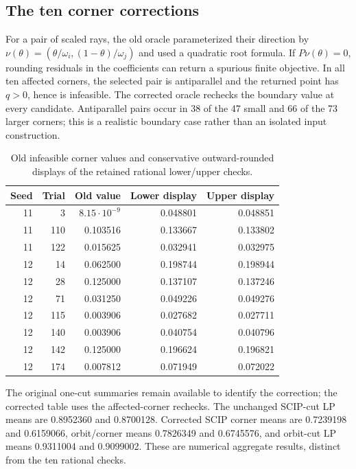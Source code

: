 \subsection{The ten corner corrections}
\label{exp:ten-corrections}

For a pair of scaled rays, the old oracle parameterized their direction
by $\nu(\theta)=(\theta/\omega_i,(1-\theta)/\omega_j)$ and used a
quadratic root formula. If $P\nu(\theta)=0$, rounding residuals in the
coefficients can return a spurious finite objective. In all ten affected
corners, the selected pair is antiparallel and the returned point has
$q>0$, hence is infeasible. The corrected oracle rechecks the boundary
value at every candidate. Antiparallel pairs occur in 38 of the 47 small
and 66 of the 73 larger corners; this is a realistic boundary case rather
than an isolated input construction.

\begin{table}[h]
\centering
\caption{Old infeasible corner values and conservative outward-rounded
displays of the retained rational lower/upper checks.}
\label{exp:correction-table}
\begin{tabular}{@{}rrrrr@{}}
\toprule
Seed & Trial & Old value & Lower display & Upper display \\
\midrule
11 & 3   & $8.15\cdot 10^{-9}$ & 0.048801 & 0.048851 \\
11 & 110 & 0.103516 & 0.133667 & 0.133802 \\
11 & 122 & 0.015625 & 0.032941 & 0.032975 \\
12 & 14  & 0.062500 & 0.198744 & 0.198944 \\
12 & 28  & 0.125000 & 0.137107 & 0.137246 \\
12 & 71  & 0.031250 & 0.049226 & 0.049276 \\
12 & 115 & 0.003906 & 0.027682 & 0.027711 \\
12 & 140 & 0.003906 & 0.040754 & 0.040796 \\
12 & 142 & 0.125000 & 0.196624 & 0.196821 \\
12 & 174 & 0.007812 & 0.071949 & 0.072022 \\
\bottomrule
\end{tabular}
\end{table}

The original one-cut summaries remain available to identify the
correction; the corrected table uses the affected-corner rechecks.
The unchanged SCIP-cut LP means are 0.8952360 and 0.8700128. Corrected
SCIP corner means are 0.7239198 and 0.6159066, orbit/corner means
0.7826349 and 0.6745576, and orbit-cut LP means 0.9311004 and 0.9099002.
These are numerical aggregate results, distinct from the ten rational
checks.

